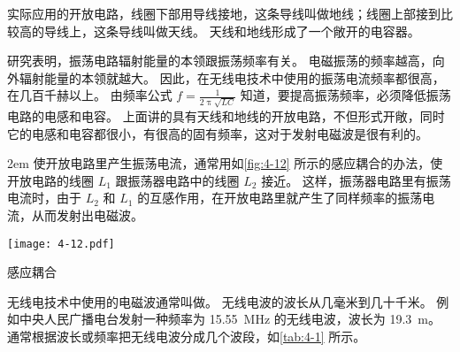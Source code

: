 实际应用的开放电路，线圈下部用导线接地，这条导线叫做地线；线圈上部接到比较高的导线上，这条导线叫做天线。
天线和地线形成了一个敞开的电容器。

研究表明，振荡电路辐射能量的本领跟振荡频率有关。
电磁振荡的频率越高，向外辐射能量的本领就越大。
因此，在无线电技术中使用的振荡电流频率都很高，在几百千赫以上。
由频率公式 $f=\frac{1}{2\uppi\sqrt{LC}}$ 知道，要提高振荡频率，必须降低振荡电路的电感和电容。
上面讲的具有天线和地线的开放电路，不但形式开敞，同时它的电感和电容都很小，有很高的固有频率，这对于发射电磁波是很有利的。

\medskip\noindent
\begin{minipage}{0.5\linewidth}\parindent2em
	使开放电路里产生振荡电流，通常用如\cref{fig:4-12} 所示的感应耦合的办法，使开放电路的线圈 $L_1$ 跟振荡器电路中的线圈 $L_2$ 接近。
	这样，振荡器电路里有振荡电流时，由于 $L_2$ 和 $L_1$ 的互感作用，在开放电路里就产生了同样频率的振荡电流，从而发射出电磁波。
\end{minipage}
\begin{minipage}{0.48\linewidth}\centering
	\begin{figurehere}
		\texttt{[image: 4-12.pdf]}
		\caption{感应耦合}\label{fig:4-12}
	\end{figurehere}
\end{minipage}

\medskip
无线电技术中使用的电磁波通常叫做。
无线电波的波长从几毫米到几十千米。
例如中央人民广播电台发射一种频率为 \qty{15.55}{MHz} 的无线电波，波长为 \qty{19.3}{m}。
通常根据波长或频率把无线电波分成几个波段，如\cref{tab:4-1} 所示。


